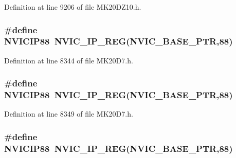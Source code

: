 Definition at line 9206 of file M\+K20\+D\+Z10.\+h.

\subsubsection[{\texorpdfstring{N\+V\+I\+C\+I\+P88}{NVICIP88}}]{\setlength{\rightskip}{0pt plus 5cm}\#define N\+V\+I\+C\+I\+P88~{\bf N\+V\+I\+C\+\_\+\+I\+P\+\_\+\+R\+EG}({\bf N\+V\+I\+C\+\_\+\+B\+A\+S\+E\+\_\+\+P\+TR},88)}\hypertarget{group___n_v_i_c___register___accessor___macros_gae92da6673e3508486b0b99fa9f1f644b}{}\label{group___n_v_i_c___register___accessor___macros_gae92da6673e3508486b0b99fa9f1f644b}


Definition at line 8344 of file M\+K20\+D7.\+h.

\subsubsection[{\texorpdfstring{N\+V\+I\+C\+I\+P88}{NVICIP88}}]{\setlength{\rightskip}{0pt plus 5cm}\#define N\+V\+I\+C\+I\+P88~{\bf N\+V\+I\+C\+\_\+\+I\+P\+\_\+\+R\+EG}({\bf N\+V\+I\+C\+\_\+\+B\+A\+S\+E\+\_\+\+P\+TR},88)}\hypertarget{group___n_v_i_c___register___accessor___macros_gae92da6673e3508486b0b99fa9f1f644b}{}\label{group___n_v_i_c___register___accessor___macros_gae92da6673e3508486b0b99fa9f1f644b}


Definition at line 8349 of file M\+K20\+D7.\+h.

\subsubsection[{\texorpdfstring{N\+V\+I\+C\+I\+P88}{NVICIP88}}]{\setlength{\rightskip}{0pt plus 5cm}\#define N\+V\+I\+C\+I\+P88~{\bf N\+V\+I\+C\+\_\+\+I\+P\+\_\+\+R\+EG}({\bf N\+V\+I\+C\+\_\+\+B\+A\+S\+E\+\_\+\+P\+TR},88)}\hypertarget{group___n_v_i_c___register___accessor___macros_gae92da6673e3508486b0b99fa9f1f644b}{}\label{group___n_v_i_c___register___accessor___macros_gae92da6673e3508486b0b99fa9f1f644b}


